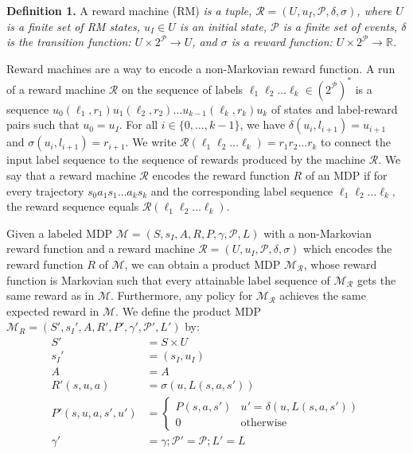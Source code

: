 \documentclass[conf]{new-aiaa}
\begin{document}
\textbf{Definition 1.} A reward machine (RM) \emph{is a tuple, $\mathcal{R} = (U, u_I, \mathcal{P}, \delta, \sigma)$, where $U$ is a finite set of RM states, $u_I \in U$ is an initial state, $\mathcal{P}$ is a finite set of events, $\delta$ is the transition function: $U \times 2^{\mathcal{P}} \to U$, and $\sigma$ is a reward function: $U \times 2^{\mathcal{P}} \to \mathbb{R}$.}

Reward machines \cite{icarte2020reward} are a way to encode a non-Markovian reward function. A run of a reward machine $\mathcal{R}$ on the sequence of labels $\ell_1 \ell_2 \dots \ell_k \in (2^{\mathcal{P}})^*$ is a sequence $u_0 (\ell_1, r_1) u_1 (\ell_2, r_2) \dots u_{k-1} (\ell_k, r_k) u_k$ of states and label-reward pairs such that $u_0 = u_I$. For all $i \in \{0, \dots, k-1 \}$, we have $\delta(u_i, l_{i+1}) = u_{i+1}$ and $\sigma(u_i, l_{i+1})=r_{i+1}$. We write $\mathcal{R}(\ell_1 \ell_2 \dots \ell_k) = r_1 r_2 \dots r_k$ to connect the input label sequence to the sequence of rewards produced by the machine $\mathcal{R}$. We say that a reward machine $\mathcal{R}$ encodes the reward function $R$ of an MDP if for every trajectory $s_0 a_1 s_1 \dots a_k s_k$ and the corresponding label sequence $\ell_1 \ell_2  \dots \ell_k$, the reward sequence equals $\mathcal{R}(\ell_1 \ell_2 \dots \ell_k)$.

Given a labeled MDP $\mathcal{M}=(S, s_I, A, R, P, \gamma, \mathcal{P}, L)$ with a non-Markovian reward function and a reward machine $\mathcal{R}=(U, u_I, \mathcal{P}, \delta, \sigma)$ which encodes the reward function $R$ of $\mathcal{M}$, we can obtain a product MDP $\mathcal{M}_{\mathcal{R}}$,  whose reward function is Markovian such that every attainable label sequence of $\mathcal{M}_{\mathcal{R}}$ gets the same reward as in $\mathcal{M}$. Furthermore, any policy for $\mathcal{M}_{\mathcal{R}}$ achieves the same expected reward in $\mathcal{M}$\cite{xu2020joint}. We define the product MDP $\mathcal{M}_R = (S', s_I', A, R', P', \gamma', \mathcal{P}', L')$ by:
\begin{equation}
    \begin{aligned}
        S' &= S \times U \\
        s_I' &= (s_I, u_I) \\
        A &= A \\
        R'(s, u, a) &=  \sigma(u, L(s, a, s'))\\
        P'( s, u, a, s', u') &= \begin{cases}
                                        P(s, a, s')  & u' = \delta(u, L(s, a, s'))\\
                                        0  & \mbox{otherwise}
                                    \end{cases} \\
        \gamma' &= \gamma; \mathcal{P}' = \mathcal{P}; L' = L
    \end{aligned}
    \label{product_Markovian}
\end{equation}
\end{document}
